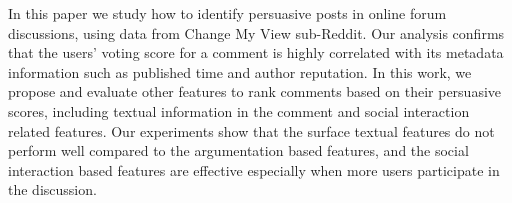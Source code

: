 In this paper we study how to identify persuasive posts in online forum discussions, using data from Change My View sub-Reddit. Our analysis confirms that the users' voting score for a comment is highly correlated with its metadata information such as published time and author reputation. In this work, we propose and evaluate other features to rank comments based on their persuasive scores, including textual information in the comment and social interaction related features. Our experiments show that the surface textual features do not perform well compared to the argumentation based features, and the social interaction based features are effective especially when more users participate in the discussion.
